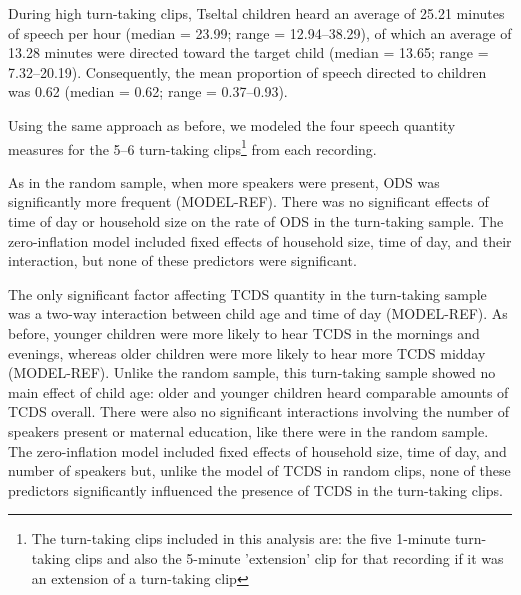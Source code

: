 \documentclass[floatsintext,man]{apa6}
\theoremstyle{definition}
\theoremstyle{definition}
\theoremstyle{definition}
\theoremstyle{remark}
\begin{document}
During high turn-taking clips, Tseltal children heard an average of
25.21 minutes of speech per hour (median = 23.99; range = 12.94--38.29),
of which an average of 13.28 minutes were directed toward the target
child (median = 13.65; range = 7.32--20.19). Consequently, the mean
proportion of speech directed to children was 0.62 (median = 0.62; range
= 0.37--0.93).

Using the same approach as before, we modeled the four speech quantity
measures for the 5--6 turn-taking
clips\footnote{The turn-taking clips included in this analysis are: the five 1-minute turn-taking clips and also the 5-minute 'extension' clip for that recording if it was an extension of a turn-taking clip}
from each recording.

As in the random sample, when more speakers were present, ODS was
significantly more frequent (MODEL-REF). There was no significant
effects of time of day or household size on the rate of ODS in the
turn-taking sample. The zero-inflation model included fixed effects of
household size, time of day, and their interaction, but none of these
predictors were significant.

The only significant factor affecting TCDS quantity in the turn-taking
sample was a two-way interaction between child age and time of day
(MODEL-REF). As before, younger children were more likely to hear TCDS
in the mornings and evenings, whereas older children were more likely to
hear more TCDS midday (MODEL-REF). Unlike the random sample, this
turn-taking sample showed no main effect of child age: older and younger
children heard comparable amounts of TCDS overall. There were also no
significant interactions involving the number of speakers present or
maternal education, like there were in the random sample. The
zero-inflation model included fixed effects of household size, time of
day, and number of speakers but, unlike the model of TCDS in random
clips, none of these predictors significantly influenced the presence of
TCDS in the turn-taking clips.
\end{document}
